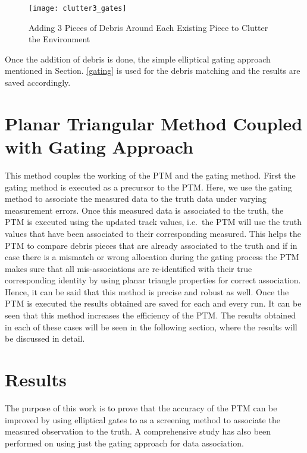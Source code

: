 \documentclass[]{aiaa-tc}%
\begin{document}
\begin{figure}[h!]
\centering
\texttt{[image: clutter3\_gates]}
\caption{Adding 3 Pieces of Debris Around Each Existing Piece to Clutter the Environment}
\label{clutter}
\end{figure}
Once the addition of debris is done, the simple elliptical gating approach mentioned in Section. \ref{gating} is used for the debris matching and the results are saved accordingly.\\

\section{Planar Triangular Method Coupled with Gating Approach}

This method couples the working of the PTM and the gating method. First the gating method is executed as a precursor to the PTM. Here, we use the gating method to associate the measured data to the truth data under varying measurement errors. Once this measured data is associated to the truth, the PTM is executed using the updated track values, i.e.~the PTM will use the truth values that have been associated to their corresponding measured. This helps the PTM to compare debris pieces that are already associated to the truth and if in case there is a mismatch or wrong allocation during the gating process the PTM makes sure that all mis-associations are re-identified with their true corresponding identity by using planar triangle properties for correct association. Hence, it can be said that this method is precise and robust as well. Once the PTM is executed the results obtained are saved for each and every run. It can be seen that this method increases the efficiency of the PTM. The results obtained in each of these cases will be seen in the following section, where the results will be discussed in detail.

\section{Results}

The purpose of this work is to prove that the accuracy of the PTM can be improved by using elliptical gates to as a screening method to associate the measured observation to the truth. A comprehensive study has also been performed on using just the gating approach for data association.\\ 
\end{document}
